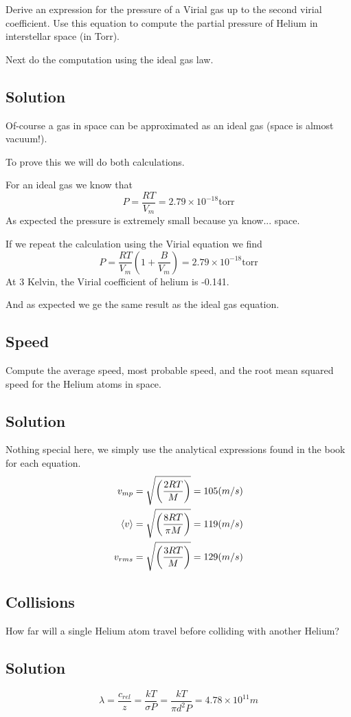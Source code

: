 \documentclass{article}
\newcommand{\be}{\begin{equation}}
\newcommand{\ee}{\end{equation}}
\begin{document}
Derive an expression for the pressure of a Virial gas up to the second virial coefficient. 
Use this equation to compute the partial pressure of Helium in interstellar space (in Torr). 

Next do the computation using the ideal gas law.

\subsection*{Solution}
Of-course a gas in space can be approximated as an ideal gas (space is almost vacuum!). 

To prove this we will do both calculations. 

For an ideal gas we know that
\be
P = \frac{RT}{V_m} = 2.79 \times 10^{-18}\text{torr}
\ee
As expected the pressure is extremely small because ya know... space. 

If we repeat the calculation using the Virial equation we find
\be
P = \frac{RT}{V_m}\left(1+\frac{B}{V_m}\right) = 2.79 \times 10^{-18}\text{torr}
\ee
At 3 Kelvin, the Virial coefficient of helium is -0.141. 

And as expected we ge the same result as the ideal gas equation. 
\subsection{Speed}
Compute the average speed, most probable speed, and the root mean squared speed for the Helium atoms in space. 

\subsection*{Solution}
Nothing special here, we simply use the analytical expressions found in the book for each equation. 
\be
\begin{split}
v_{mp} &= \sqrt{\left(\frac{2RT}{M}\right)} = 105(m/s)\\
\braket{v} &=\sqrt{\left(\frac{8RT}{\pi M}\right)} = 119(m/s)\\
v_{rms} &= \sqrt{\left(\frac{3RT}{M}\right)} = 129(m/s)
\end{split}
\ee

\subsection{Collisions}
How far will a single Helium atom travel before colliding with another Helium?

\subsection*{Solution}
\be
\lambda = \frac{c_{rel}}{z} = \frac{kT}{\sigma P} = \frac{kT}{\pi d^2 P} = 4.78 \times 10^{11}m
\ee
\end{document}
